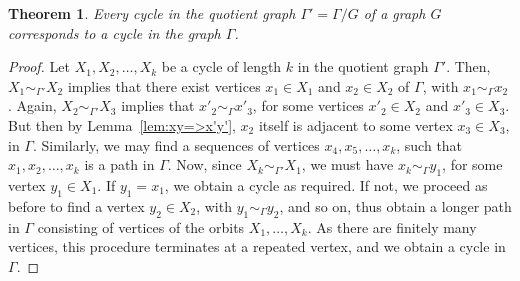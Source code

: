 \documentclass[12pt,a4paper]{amsart}
\newtheorem{Theorem}{Theorem}[section]
\theoremstyle{remark}
\theoremstyle{definition}
\newcommand{\adj}[1]{\sim_{\scriptscriptstyle #1}}
\begin{document}
\begin{Theorem}
\label{thm:CycCorr}
Every cycle in the quotient graph $\Gamma' = \Gamma/G$ of a graph $G$ corresponds to a cycle in the graph $\Gamma$.
\end{Theorem}
\begin{proof}
Let $X_1, X_2, \ldots, X_k$ be a cycle of length $k$ in the quotient graph $\Gamma'$. Then, $X_1 \adj{\Gamma'} X_2$ implies that there exist vertices $x_1 \in X_1$ and $x_2 \in X_2$ of $\Gamma$, with $x_1 \adj{\Gamma} x_2$. Again, $X_2 \adj{\Gamma'} X_3$ implies that $x'_2 \adj{\Gamma} x'_3$, for some vertices $x'_2 \in X_2$ and $x'_3 \in X_3$. But then by Lemma~\ref{lem:xy=>x'y'}, $x_2$ itself is adjacent to some vertex $x_3 \in X_3$, in $\Gamma$. Similarly, we may find a sequences of vertices $x_4, x_5, \ldots, x_k$, such that $x_1, x_2, \ldots, x_k$ is a path in $\Gamma$. Now, since $X_k \adj{\Gamma'} X_1$, we must have $x_k \adj{\Gamma} y_1$, for some vertex $y_1 \in X_1$. If $y_1 = x_1$, we obtain a cycle as required. If not, we proceed as before to find a vertex $y_2 \in X_2$, with $y_1 \adj{\Gamma} y_2$, and so on, thus obtain a longer path in $\Gamma$ consisting of vertices of the orbits $X_1, \ldots, X_k$. As there are finitely many vertices, this procedure terminates at a repeated vertex, and we obtain a cycle in $\Gamma$.
\end{proof}
\end{document}
